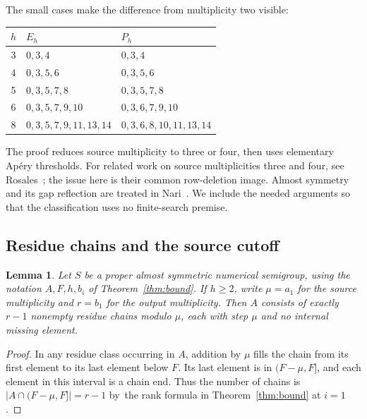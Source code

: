 \documentclass[11pt,a4paper]{article}
\newtheorem{lemma}[theorem]{Lemma}
\theoremstyle{definition}
\theoremstyle{remark}
\begin{document}
The small cases make the difference from multiplicity two visible:
\begin{center}
\begin{tabular}{cll}
\toprule
$h$ & $E_h$ & $P_h$\\
\midrule
3 & $0,3,4$ & $0,3,4$\\
4 & $0,3,5,6$ & $0,3,5,6$\\
5 & $0,3,5,7,8$ & $0,3,5,7,8$\\
6 & $0,3,5,7,9,10$ & $0,3,6,7,9,10$\\
8 & $0,3,5,7,9,11,13,14$ & $0,3,6,8,10,11,13,14$\\
\bottomrule
\end{tabular}
\end{center}

The proof reduces source multiplicity to three or four, then uses elementary
Ap\'ery thresholds. For related work on source multiplicities three and four,
see Rosales~\cite{Rosales}; the issue here is their common row-deletion
image. Almost symmetry and its gap reflection are treated in
Nari~\cite[Section~2]{Nari}. We include the needed arguments so that the
classification uses no finite-search premise.


\subsection{Residue chains and the source cutoff}
\begin{lemma}\label{lem:rank}
Let $S$ be a proper almost symmetric numerical semigroup, using the
notation $A,F,h,b_i$ of Theorem~\ref{thm:bound}. If $h\geq2$, write
$\mu=a_1$ for the source multiplicity and $r=b_1$ for the output multiplicity.
Then $A$ consists of exactly $r-1$ nonempty residue chains modulo $\mu$,
each with step $\mu$ and no internal missing element.
\end{lemma}
\begin{proof}
In any residue class occurring in $A$, addition by $\mu$ fills the chain
from its first element to its last element below $F$. Its last element
is in $(F-\mu,F]$, and each element in this interval is a chain end.
Thus the number of chains is $|A\cap(F-\mu,F]|=r-1$ by~the rank formula in Theorem~\ref{thm:bound}
at $i=1$.
\end{proof}
\end{document}
